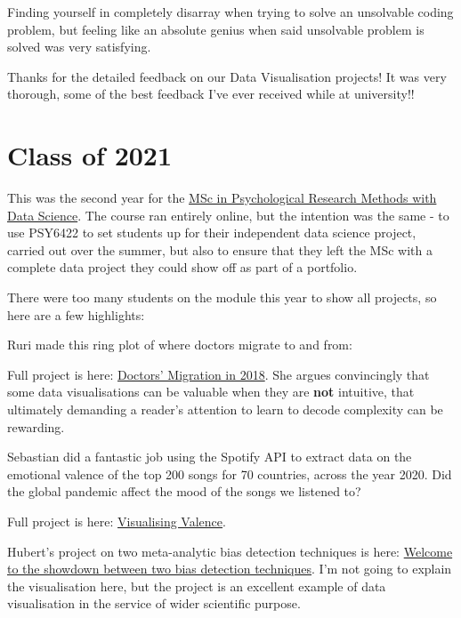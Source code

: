 \documentclass[
]{book}
\begin{document}
Finding yourself in completely disarray when trying to solve an unsolvable coding problem, but feeling like an absolute genius when said unsolvable problem is solved was very satisfying.

Thanks for the detailed feedback on our Data Visualisation projects! It was very thorough, some of the best feedback I've ever received while at university!!

\hypertarget{class-of-2021}{%
\chapter{Class of 2021}\label{class-of-2021}}

This was the second year for the \href{https://www.sheffield.ac.uk/postgraduate/taught/courses/2022/psychological-research-methods-data-science-msc}{MSc in Psychological Research Methods with Data Science}. The course ran entirely online, but the intention was the same - to use PSY6422 to set students up for their independent data science project, carried out over the summer, but also to ensure that they left the MSc with a complete data project they could show off as part of a portfolio.

There were too many students on the module this year to show all projects, so here are a few highlights:

Ruri made this ring plot of where doctors migrate to and from:

Full project is here: \href{https://protor23.github.io/doctors-migration-2018/}{Doctors' Migration in 2018}. She argues convincingly that some data visualisations can be valuable when they are \textbf{not} intuitive, that ultimately demanding a reader's attention to learn to decode complexity can be rewarding.

Sebastian did a fantastic job using the Spotify API to extract data on the emotional valence of the top 200 songs for 70 countries, across the year 2020. Did the global pandemic affect the mood of the songs we listened to?

Full project is here: \href{https://sebastianplnr.github.io/spotify_audio_feature_analysis/}{Visualising Valence}.

Hubert's project on two meta-analytic bias detection techniques is here: \href{https://hubertplisiecki.shinyapps.io/pcurve_vs_zcurve/}{Welcome to the showdown between two
bias detection techniques}. I'm not going to explain the visualisation here, but the project is an excellent example of data visualisation in the service of wider scientific purpose.
\end{document}
